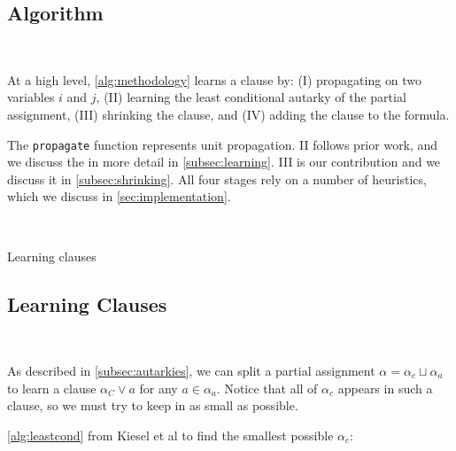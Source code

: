 \subsection{Algorithm}~\label{subsec:methodology}


At a high level, \autoref{alg:methodology} learns a \pr clause by: (I) propagating on two variables $i$ and $j$, (II) learning the least conditional autarky of the partial assignment, (III) shrinking the clause, and (IV) adding the clause to the formula. 

The \texttt{propagate} function represents unit propagation. II follows prior work, and we discuss the  in more detail in \autoref{subsec:learning}. III is our contribution and we discuss it in \autoref{subsec:shrinking}. All four stages rely on a number of heuristics, which we discuss in \autoref{sec:implementation}.

\begin{algorithm}~\label{alg:methodology}
    \caption{Learning \pr clauses}\label{alg:methodology}
    \SetAlgoNoLine
\end{algorithm}

\subsection{Learning Clauses}~\label{subsec:learning}

As described in \autoref{subsec:autarkies}, we can split a partial assignment $\alpha = \alpha_c \sqcup \alpha_a$ to learn a \pr clause $\alpha_C \lor a$ for any $a \in \alpha_a$. Notice that all of $\alpha_c$ appears in such a clause, so we must try to keep in as small as possible.

\autoref{alg:leastcond} from Kiesel et al \cite{conditionalautarkies} to find the smallest possible $\alpha_c$:


